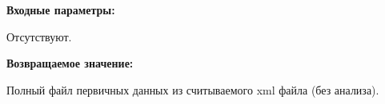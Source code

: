 \textbf{Входные параметры:}

Отсутствуют.

\textbf{Возвращаемое значение:}

Полный файл первичных данных из считываемого xml файла (без анализа).
